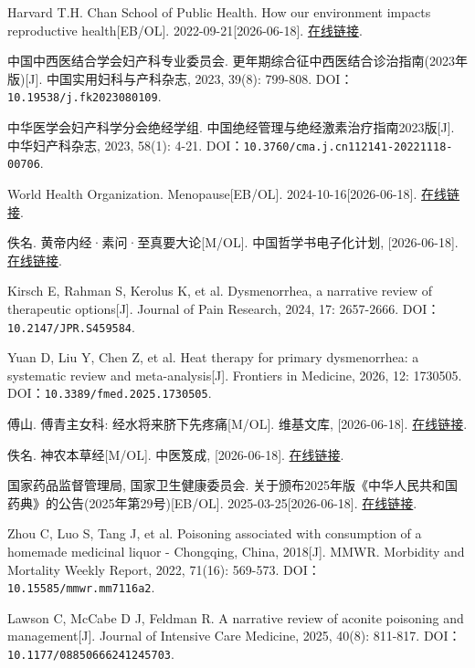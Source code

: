 \begin{enumerate}[label={[Q\arabic*]},leftmargin=*]
  \item Harvard T.H. Chan School of Public Health. How our environment impacts reproductive health[EB/OL]. 2022-09-21[2026-06-18]. \href{https://hsph.harvard.edu/news/how-our-environment-impacts-reproductive-health/}{在线链接}.
  \item 中国中西医结合学会妇产科专业委员会. 更年期综合征中西医结合诊治指南(2023年版)[J]. 中国实用妇科与产科杂志, 2023, 39(8): 799-808. DOI：\nolinkurl{10.19538/j.fk2023080109}.
  \item 中华医学会妇产科学分会绝经学组. 中国绝经管理与绝经激素治疗指南2023版[J]. 中华妇产科杂志, 2023, 58(1): 4-21. DOI：\nolinkurl{10.3760/cma.j.cn112141-20221118-00706}.
  \item World Health Organization. Menopause[EB/OL]. 2024-10-16[2026-06-18]. \href{https://www.who.int/news-room/fact-sheets/detail/menopause}{在线链接}.
  \item 佚名. 黄帝内经·素问·至真要大论[M/OL]. 中国哲学书电子化计划, [2026-06-18]. \href{https://ctext.org/huangdi-neijing/zhi-zhen-yao-da-lun/zh}{在线链接}.
  \item Kirsch E, Rahman S, Kerolus K, et al. Dysmenorrhea, a narrative review of therapeutic options[J]. Journal of Pain Research, 2024, 17: 2657-2666. DOI：\nolinkurl{10.2147/JPR.S459584}.
  \item Yuan D, Liu Y, Chen Z, et al. Heat therapy for primary dysmenorrhea: a systematic review and meta-analysis[J]. Frontiers in Medicine, 2026, 12: 1730505. DOI：\nolinkurl{10.3389/fmed.2025.1730505}.
  \item 傅山. 傅青主女科: 经水将来脐下先疼痛[M/OL]. 维基文库, [2026-06-18]. \href{https://zh.wikisource.org/zh-hans/傅青主女科}{在线链接}.
  \item 佚名. 神农本草经[M/OL]. 中医笈成, [2026-06-18]. \href{https://jicheng.tw/tcm/book/神農本草經_2/index.html}{在线链接}.
  \item 国家药品监督管理局, 国家卫生健康委员会. 关于颁布2025年版《中华人民共和国药典》的公告(2025年第29号)[EB/OL]. 2025-03-25[2026-06-18]. \href{https://www.nmpa.gov.cn/xxgk/fgwj/gzwj/gzwjyp/20250325183810122.html}{在线链接}.
  \item Zhou C, Luo S, Tang J, et al. Poisoning associated with consumption of a homemade medicinal liquor - Chongqing, China, 2018[J]. MMWR. Morbidity and Mortality Weekly Report, 2022, 71(16): 569-573. DOI：\nolinkurl{10.15585/mmwr.mm7116a2}.
  \item Lawson C, McCabe D J, Feldman R. A narrative review of aconite poisoning and management[J]. Journal of Intensive Care Medicine, 2025, 40(8): 811-817. DOI：\nolinkurl{10.1177/08850666241245703}.

\end{enumerate}
